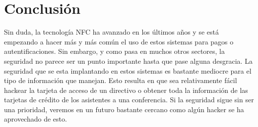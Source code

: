 \chapter{Conclusión}\label{ch:conclusion}
Sin duda, la tecnología NFC ha avanzado en los últimos años y se está empezando a hacer más y más común el uso de estos sistemas para pagos o autentificaciones. Sin embargo, y como pasa en muchos otros sectores, la seguridad no parece ser un punto importante hasta que pase alguna desgracia. La seguridad que se esta implantando en estos sistemas es bastante mediocre para el tipo de información que manejan. Esto resulta en que sea relativamente fácil hackear la tarjeta de acceso de un directivo o obtener toda la información de las tarjetas de crédito de los asistentes a una conferencia. Si la seguridad sigue sin ser una prioridad, veremos en un futuro bastante cercano como algún hacker se ha aprovechado de esto.
